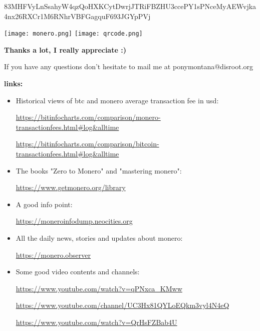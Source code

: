 \documentclass{article}
\begin{document}
\hspace{-3.5cm} \footnotesize{83MHFVyLnSsahyW4qzQoHXKCytDwrjJTRiFBZHU3ccePY1sPNceMyAEWvjka4nx26RXCr1M6RNhrVBFGagquF693JGYpPVj} \vspace{0.3cm}


\hspace{3cm} \texttt{[image: monero.png]}
\hspace{0.5cm}\texttt{[image: qrcode.png]} \vspace{0.5cm}

\hspace{2cm} \normalsize{} \textbf{Thanks a lot, I really appreciate :)}\vspace{1cm}

\hspace{-0.5cm}If you have any questions don't hesitate to mail me at ponymontana@disroot.org\vspace{4cm}



\textbf{links:}
\footnotesize{}
\begin{itemize}

	\item Historical views of btc and monero average transaction fee in usd:


		\url{https://bitinfocharts.com/comparison/monero-transactionfees.html#log&alltime}


		\url{https://bitinfocharts.com/comparison/bitcoin-transactionfees.html#log&alltime}


\item The books "Zero to Monero" and "mastering monero":



	\url{https://www.getmonero.org/library}



\item A good info point:



	\url{https://moneroinfodump.neocities.org}


\item All the daily news, stories and updates about monero:


	\url{https://monero.observer}

\item Some good video contents and channels:


	\url{https://www.youtube.com/watch?v=qPNxca_KMww}


	\url{https://www.youtube.com/channel/UC3Hx81QYLoEQkm3vyl4N4eQ}


	\url{https://www.youtube.com/watch?v=QrHsFZBab4U}

\end{itemize}
\end{document}
